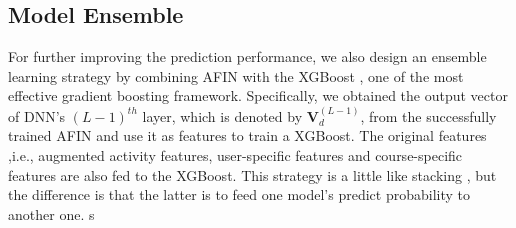 \subsection{Model Ensemble}
\label{sec:ensem}
For further improving the prediction performance, we also design an ensemble learning strategy by combining AFIN with the XGBoost \cite{Chen:2016:XST:2939672.2939785}, one of the most effective gradient boosting framework. Specifically, we obtained the output vector of DNN's $(L-1)^{th}$ layer, which is denoted by $\mathbf{V}_{d}^{(L-1)}$, from the successfully trained AFIN and use it as features to train a XGBoost. The original features ,i.e., augmented activity features, user-specific features and course-specific features are also fed to the XGBoost. This strategy is a little like stacking \cite{wolpert1992stacked}, but the difference is that the latter is to feed one model's predict probability to another one.
s
